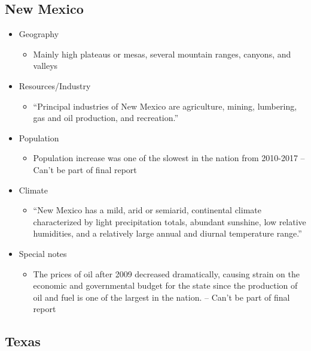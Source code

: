 \documentclass[9pt,twocolumn,twoside]{pnas-new}
\begin{document}
\subsection*{New Mexico}

\begin{itemize}
\item Geography
\begin{itemize}
\item Mainly high plateaus or mesas, several mountain ranges, canyons, and valleys
\end{itemize}

\item Resources/Industry
\begin{itemize}
\item “Principal industries of New Mexico are agriculture, mining, lumbering, gas and oil production, and recreation.”
\end{itemize}

\item Population
\begin{itemize}
\item Population increase was one of the slowest in the nation from 2010-2017 -- Can't be part of final report
\end{itemize}

\item Climate
\begin{itemize}
\item “New Mexico has a mild, arid or semiarid, continental climate characterized by light precipitation totals, abundant sunshine, low relative humidities, and a relatively large annual and diurnal temperature range.”
\end{itemize}

\item Special notes
\begin{itemize}
\item The prices of oil after 2009 decreased dramatically, causing strain on the economic and governmental budget for the state since the production of oil and fuel is one of the largest in the nation. -- Can't be part of final report
\end{itemize}

\end{itemize}

\subsection*{Texas}
\end{document}
